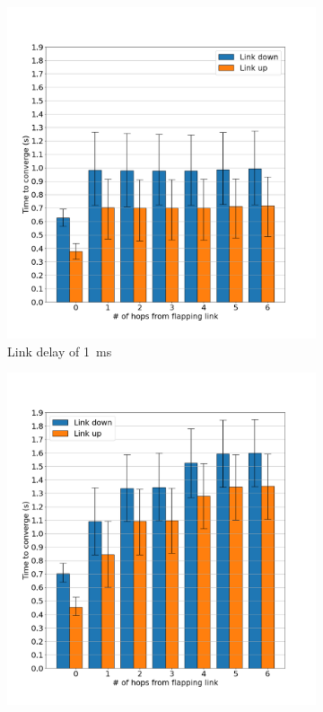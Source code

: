 \documentclass[10pt,twoside,a4paper]{article}
\begin{document}
\begin{figure}[H]
\centering
\begin{subfigure}{.5\textwidth}
  \centering
  \includegraphics[width=1\linewidth]{conv_1ms}
  \caption{Link delay of \SI{1}{\ms}}
  \label{fig:conv_1ms}
\end{subfigure}%
\begin{subfigure}{.5\textwidth}
  \centering
  \includegraphics[width=1\linewidth]{conv_100ms}

\end{subfigure}
\end{figure}
\end{document}
